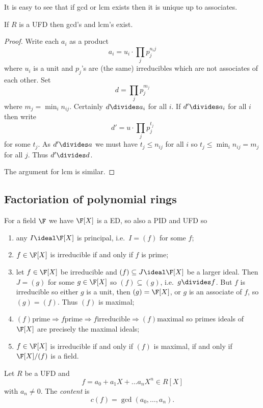 \documentclass[a4paper]{article}
\theoremstyle{definition}
\begin{document}
It is easy to see that if gcd or lcm exists then it is unique up to associates.

\begin{proposition}
  If \(R\) is a UFD then gcd's and lcm's exist.
\end{proposition}

\begin{proof}
  Write each \(a_i\) as a product
  \[
    a_i = u_i \cdot \prod_j p_j^{n_ij}
  \]
  where \(u_i\) is a unit and \(p_j\)'s are (the same) irreducibles which are not associates of each other. Set
  \[
    d = \prod_j p_j^{m_j}
  \]
  where \(m_j = \min_i n_{ij}\). Certainly \(d \divides a_i\) for all \(i\). If \(d' \divides a_i\) for all \(i\) then write
  \[
    d' = u \cdot \prod_j p_j^{t_j}
  \]
  for some \(t_j\). As \(d' \divides a\) we must have \(t_j \leq n_{ij}\) for all \(i\) so \(t_j \leq \min_i n_{ij} = m_j\) for all \(j\). Thus \(d' \divides d\).

  The argument for lcm is similar.
\end{proof}

\subsection{Factoriation of polynomial rings}

For a field \(\F\) we have \(\F[X]\) is a ED, so also a PID and UFD so
\begin{enumerate}
\item any \(I \ideal \F[X]\) is principal, i.e.\ \(I = (f)\) for some \(f\);
\item \(f \in \F[X]\) is irreducible if and only if \(f\) is prime;
\item let \(f \in \F[X]\) be irreducible and \((f) \subseteq J \ideal \F[X]\) be a larger ideal. Then \(J = (g)\) for some \(g \in \F[X]\) so \((f) \subseteq (g)\), i.e.\ \(g \divides f\). But \(f\) is irreducible so either \(g\) is a unit, then \((g) = \F[X]\), or \(g\) is an associate of \(f\), so \((g) = (f)\). Thus \((f)\) is maximal;
\item \((f) \text{prime} \Rightarrow f \text{prime} \Rightarrow f \text{irreducible} \Rightarrow (f) \text{maximal}\) so primes ideals of \(\F[X]\) are precisely the maximal ideals;
\item \(f \in \F[X]\) is irreducible if and only if \((f)\) is maximal, if and only if \(\F[X]/(f)\) is a field.
\end{enumerate}

\begin{definition}[Content]
  Let \(R\) be a UFD and
  \[
    f = a_0 + a_1X + \dots a_nX^n \in R[X]
  \]
  with \(a_n \neq 0\). The \emph{content} is
  \[
    c(f) = \gcd(a_0, \dots, a_n).
  \]
\end{definition}
\end{document}
